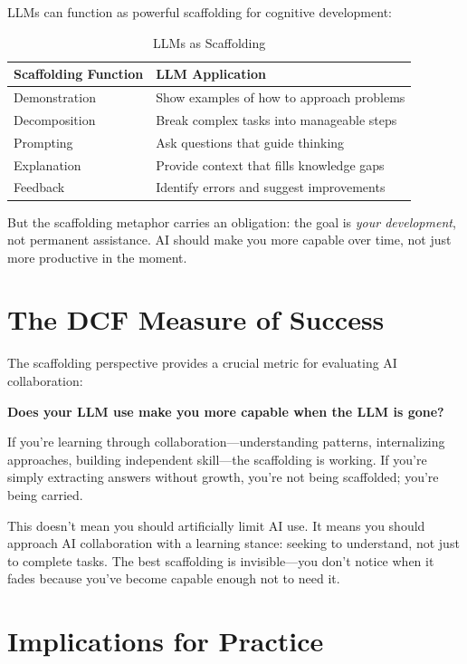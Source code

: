 LLMs can function as powerful scaffolding for cognitive development:

\begin{table}[H]
\centering
\begin{tabular}{ll}
\toprule
\textbf{Scaffolding Function} & \textbf{LLM Application} \\
\midrule
Demonstration & Show examples of how to approach problems \\
Decomposition & Break complex tasks into manageable steps \\
Prompting & Ask questions that guide thinking \\
Explanation & Provide context that fills knowledge gaps \\
Feedback & Identify errors and suggest improvements \\
\bottomrule
\end{tabular}
\caption{LLMs as Scaffolding}
\end{table}

But the scaffolding metaphor carries an obligation: the goal is \emph{your development}, not permanent assistance. AI should make you more capable over time, not just more productive in the moment.

\section{The DCF Measure of Success}

The scaffolding perspective provides a crucial metric for evaluating AI collaboration:

\begin{quotebox}
\textbf{Does your LLM use make you more capable when the LLM is gone?}
\end{quotebox}

If you're learning through collaboration---understanding patterns, internalizing approaches, building independent skill---the scaffolding is working. If you're simply extracting answers without growth, you're not being scaffolded; you're being carried.

This doesn't mean you should artificially limit AI use. It means you should approach AI collaboration with a learning stance: seeking to understand, not just to complete tasks. The best scaffolding is invisible---you don't notice when it fades because you've become capable enough not to need it.

\section{Implications for Practice}

